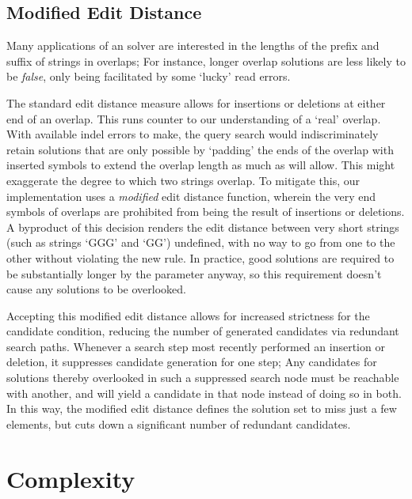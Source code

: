 \subsection{Modified Edit Distance}
Many applications of an \aspop{} solver are interested in the lengths of the prefix and suffix of strings in overlaps; For instance, longer overlap \glspl{solution} are less likely to be \textit{false}, only being facilitated by some `lucky' read \glspl{error}.
 
The standard \gls{edit distance} measure allows for \glspl{insertion} or \glspl{deletion} at either end of an overlap. This runs counter to our understanding of a `real' overlap. With available indel errors to make, the \gls{query} search would indiscriminately retain solutions that are only possible by `padding' the ends of the overlap with inserted symbols to extend the overlap length as much as  will allow. This might exaggerate the degree to which two strings overlap. To mitigate this, our implementation uses a \textit{modified} edit distance function, wherein the very end symbols of overlaps are prohibited from being the result of insertions or deletions. A byproduct of this decision renders the edit distance between very short strings (such as strings `GGG' and `GG') undefined, with no way to go from one to the other without violating the new rule. In practice, good solutions are required to be substantially longer by the  parameter anyway, so this requirement doesn't cause any solutions to be overlooked.
 
Accepting this modified edit distance allows for increased strictness for the \gls{candidate condition}, reducing the number of generated candidates via redundant search paths. Whenever a search step most recently performed an insertion or deletion, it suppresses candidate generation for one step; Any candidates for solutions thereby overlooked in such a suppressed search node must be reachable with another, and will yield a candidate in that node instead of doing so in both. In this way, the modified edit distance defines the solution set to miss just a few elements, but cuts down a significant number of redundant candidates.







\section{Complexity}
\label{complexity}

